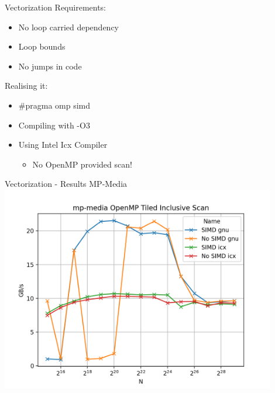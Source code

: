 \begin{frame}{Vectorization}
	Requirements:
	\begin{itemize}
		\item No loop carried dependency
		\item Loop bounds
		\item No jumps in code
	\end{itemize}
	
	Realising it:
	\begin{itemize}
		\item \#pragma omp simd
		\item Compiling with -O3
		\item Using Intel Icx Compiler
		\begin{itemize}
		 \item No OpenMP provided scan!
		\end{itemize}

		
	\end{itemize}
\end{frame} 

\begin{frame}{Vectorization - Results MP-Media}
	\centering
	\vspace{-5pt}
	\includegraphics[width=0.90\textwidth]{graphs/mp-media OpenMP Tiled Inclusive Scan.png}
\end{frame}

